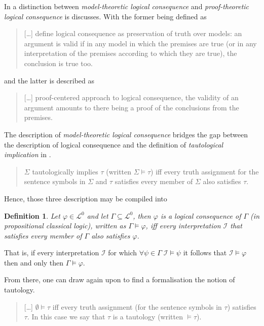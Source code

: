 \documentclass[11pt,a4paper]{article}
\newtheorem{mydef}{Definition}
\begin{document}
In \cite{seplogicalconsequence} a distinction between \emph{model-theoretic logical consequence} and \emph{proof-theoretic logical consequence} is discusses. With the former being defined as 

\begin{quote}
[\dots] define logical consequence as preservation of truth over models: an argument is valid if in any model in which the premises are true (or in any interpretation of the premises according to which they are true), the conclusion is true too.
\end{quote}

and the latter is described as

\begin{quote}
[\dots] proof-centered approach to logical consequence, the validity of an argument amounts to there being a proof of the conclusions from the premises.
\end{quote}

The description of \emph{model-theoretic logical consequence} bridges the gap between the description of logical consequence and the definition of \emph{tautological implication} in \cite{enderton2001mathematical}. 

\begin{quote}
$\Sigma$ tautologically implies $\tau$ (written $\Sigma \models \tau$) iff every truth assignment for the sentence symbols in $\Sigma$ and $\tau$ satisfies every member of $\Sigma$ also satisfies $\tau$.
\end{quote}

Hence, those three description may be compiled into 
 
\begin{mydef}
Let $\varphi \in \mathcal{L}^0$ and let $\Gamma \subseteq \mathcal{L}^0$, then $\varphi$ is a logical consequence of $\Gamma$ (in propositional classical logic), written as $\Gamma \models \varphi$, iff every interpretation $\mathcal{I}$ that satisfies every member of $\Gamma$ also satisfies $\varphi$.
\end{mydef}
That is, if every interpretation $\mathcal{I}$ for which $\forall \psi \in \Gamma \; \mathcal{I}\models \psi$ it follows that $\mathcal{I} \models \varphi$ then and only then $\Gamma \models \varphi$.

From there, one can draw again upon \cite{enderton2001mathematical} to find a formalisation the notion of 
tautology.

\begin{quote}
[\dots] $\emptyset \models \tau$ iff every truth assignment (for the sentence symbols in $\tau$) satisfies $\tau$. In this case we say that $\tau$ is a tautology (written $\models \tau$).
\end{quote}
\end{document}

